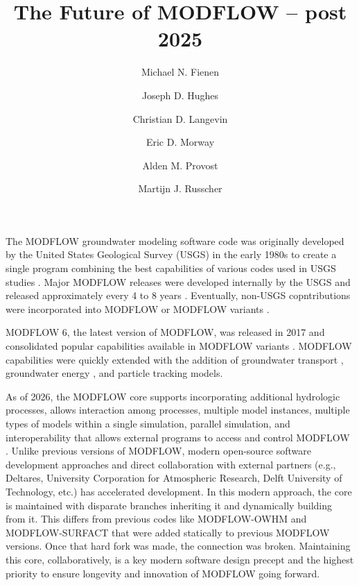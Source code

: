 \documentclass[11pt, oneside]{article}   	%
\date{}							%
\begin{document}
\title{The Future of MODFLOW -- post 2025}

\author[1]{Michael N. Fienen}
\author[2]{Joseph D. Hughes}
\author[3]{Christian D. Langevin}
\author[4, *]{Eric D. Morway}
\author[5]{Alden M. Provost}
\author[6]{Martijn J. Russcher}

\maketitle

The MODFLOW groundwater modeling software code was originally developed by the United States Geological Survey (USGS) in the early 1980s to create a single program combining the best capabilities of various codes used in USGS studies \citep{mcdonald2003}. Major MODFLOW releases were developed internally by the USGS and released approximately every 4 to 8 years \citep{modflow84, modflow88, harbaugh1996user, hill2000modflow, modflow2005}. Eventually, non-USGS copntributions were incorporated into MODFLOW \citep[for example,][]{hoffmann2003modflow, wilson2004modflow, bakker2013documentation} or MODFLOW variants \citep[e.g.,][]{modflowvsf, modflownwt, modflowusg}.

MODFLOW 6, the latest version of MODFLOW, was released in 2017 and consolidated popular capabilities available in MODFLOW variants \citep{modflow6gwf}. MODFLOW capabilities were quickly extended with the addition of groundwater transport \citep{modflow6gwt}, groundwater energy \citep{morway2025new}, and particle tracking models. 

As of 2026, the MODFLOW core supports incorporating additional hydrologic processes, allows interaction among processes, multiple model instances, multiple types of models within a single simulation, parallel simulation, and interoperability that allows external programs to access and control MODFLOW \citep{langevin2024modflow}. Unlike previous versions of MODFLOW, modern open-source software development approaches and direct collaboration with external partners (e.g., Deltares, University Corporation for Atmospheric Research, Delft University of Technology, etc.\@) has accelerated development. In this modern approach, the core is maintained with disparate branches inheriting it and dynamically building from it. This differs from previous codes like MODFLOW-OWHM and MODFLOW-SURFACT \citep{boyce2020, panday2008modflow} that were added statically to previous MODFLOW versions. Once that hard fork was made, the connection was broken. Maintaining this core, collaboratively, is a key modern software design precept and the highest priority to ensure longevity and innovation of MODFLOW going forward.
\end{document}
